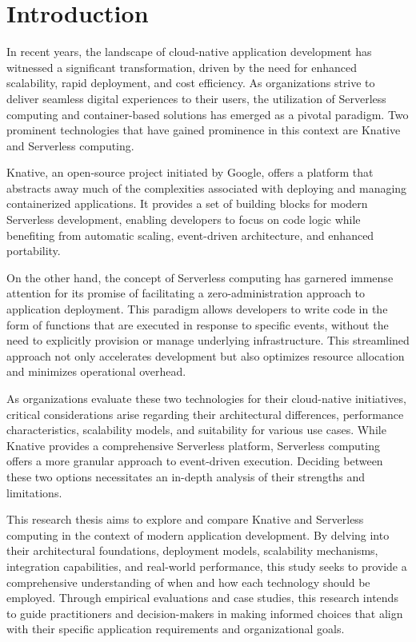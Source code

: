 \documentclass[12pt]{article}
\begin{document}
\section{Introduction}
\begin{flushleft}
In recent years, the landscape of cloud-native application development has witnessed a significant transformation, driven by the need for enhanced scalability, rapid deployment, and cost efficiency. As organizations strive to deliver seamless digital experiences to their users, the utilization of Serverless computing and container-based solutions has emerged as a pivotal paradigm. Two prominent technologies that have gained prominence in this context are Knative and Serverless computing.

Knative, an open-source project initiated by Google, offers a platform that abstracts away much of the complexities associated with deploying and managing containerized applications. It provides a set of building blocks for modern Serverless development, enabling developers to focus on code logic while benefiting from automatic scaling, event-driven architecture, and enhanced portability.

On the other hand, the concept of Serverless computing has garnered immense attention for its promise of facilitating a zero-administration approach to application deployment. This paradigm allows developers to write code in the form of functions that are executed in response to specific events, without the need to explicitly provision or manage underlying infrastructure. This streamlined approach not only accelerates development but also optimizes resource allocation and minimizes operational overhead.

As organizations evaluate these two technologies for their cloud-native initiatives, critical considerations arise regarding their architectural differences, performance characteristics, scalability models, and suitability for various use cases. While Knative provides a comprehensive Serverless platform, Serverless computing offers a more granular approach to event-driven execution. Deciding between these two options necessitates an in-depth analysis of their strengths and limitations.

This research thesis aims to explore and compare Knative and Serverless computing in the context of modern application development. By delving into their architectural foundations, deployment models, scalability mechanisms, integration capabilities, and real-world performance, this study seeks to provide a comprehensive understanding of when and how each technology should be employed. Through empirical evaluations and case studies, this research intends to guide practitioners and decision-makers in making informed choices that align with their specific application requirements and organizational goals.


\end{flushleft}
\end{document}

